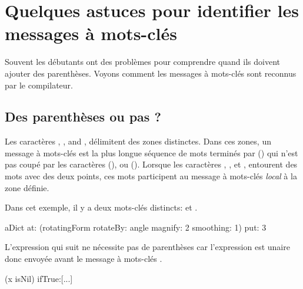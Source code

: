 \documentclass[a4paper,10pt,twoside]{book}
\begin{document}
\section{Quelques astuces pour identifier les messages \`a mots-cl\'es}
Souvent les d\'ebutants ont des probl\`emes pour comprendre quand ils doivent ajouter des parenth\`eses. Voyons comment les messages \`a mots-cl\'es sont reconnus par le compilateur.

\subsection{Des parenth\`eses ou pas ?}
Les caract\`eres \ct{[}, \ct{]}, and \ct{(}, \ct{)} 
d\'elimitent des zones distinctes. Dans ces zones, un message \`a mots-cl\'es est la plus longue s\'equence de mots termin\'es par (\ct{:}) qui n'est pas coup\'e par les caract\`eres (), ou (\ct{;}). 
Lorsque les caract\`eres \ct{[}, \ct{]}, et \ct{(}, \ct{)} entourent des mots avec des deux points, ces mots participent au message \`a mots-cl\'es \emph{local} \`a la zone d\'efinie.

Dans cet exemple, il y a deux mots-cl\'es distincts:  et .

\begin{code}{}
aDict
   at: (rotatingForm 
          rotateBy: angle	
          magnify: 2 
          smoothing: 1)
   put: 3
\end{code}




L'expression qui suit ne n\'ecessite pas de parenth\`eses car l'expression  est unaire donc envoy\'ee avant le message \`a mots-cl\'es \mbox{.}
\begin{code}{}
(x isNil)
   ifTrue:[...]
\end{code}
\end{document}
